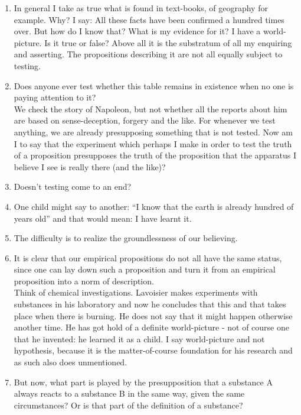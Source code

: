 \documentclass{book}
\begin{document}
\begin{enumerate}
\item
In general I take as true what is found in text-books, of geography for
example. Why? I say: All these facts have been confirmed a hundred times over.
But how do I know that? What is my evidence for it? I have a world-picture. Is
it true or false? Above all it is the substratum of all my enquiring and
asserting. The propositions describing it are not all equally subject to
testing.

\item
Does anyone ever test whether this table remains in existence when no one is
paying attention to it? \\
We check the story of Napoleon, but not whether all the reports about him are
based on sense-deception, forgery and the like. For whenever we test anything,
we are already presupposing something that is not tested. Now am I to say that
the experiment which perhaps I make in order to test the truth of a proposition
presupposes the truth of the proposition that the apparatus I believe I see is
really there (and the like)?

\item
Doesn't testing come to an end?

\item
One child might say to another: ``I know that the earth is already hundred of
years old'' and that would mean: I have learnt it.

\item
The difficulty is to realize the groundlessness of our believing.

\item
It is clear that our empirical propositions do not all have the same status,
since one can lay down such a proposition and turn it from an empirical
proposition into a norm of description. \\
Think of chemical investigations.  Lavoisier makes experiments with substances
in his laboratory and now he concludes that this and that takes place when
there is burning. He does not say that it might happen otherwise another time.
He has got hold of a definite world-picture - not of course one that he
invented: he learned it as a child. I say world-picture and not hypothesis,
because it is the matter-of-course foundation for his research and as such also
does unmentioned.

\item
But now, what part is played by the presupposition that a substance A always
reacts to a substance B in the same way, given the same circumstances? Or is
that part of the definition of a substance?


\end{enumerate}
\end{document}
